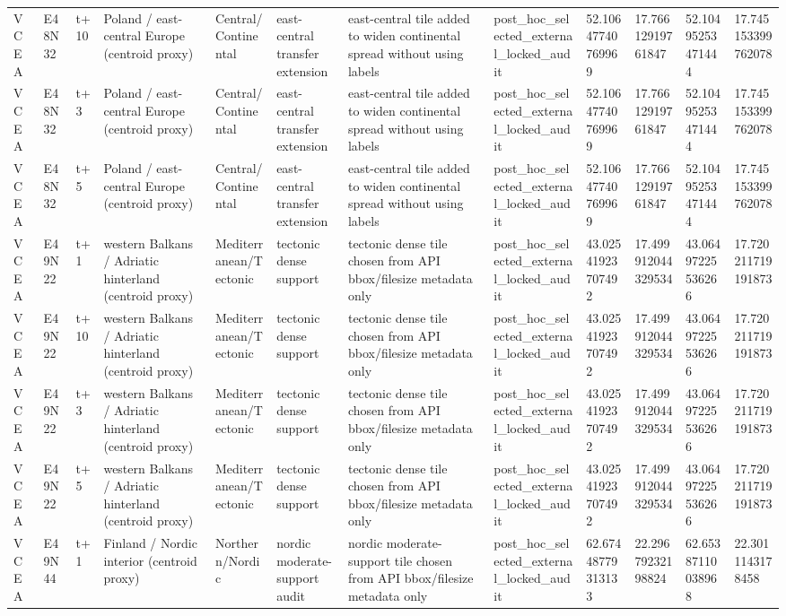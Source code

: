 \begin{landscape}
\begin{longtable}{llllllllllll}
VCEA & E48N32 & t+10 & Poland / east-central Europe (centroid proxy) & Central/Continental & east-central transfer extension & east-central tile added to widen continental spread without using labels & post\_hoc\_selected\_external\_locked\_audit & 52.10647740769969 & 17.76612919761847 & 52.10495253471444 & 17.745153399762078 \\
VCEA & E48N32 & t+3 & Poland / east-central Europe (centroid proxy) & Central/Continental & east-central transfer extension & east-central tile added to widen continental spread without using labels & post\_hoc\_selected\_external\_locked\_audit & 52.10647740769969 & 17.76612919761847 & 52.10495253471444 & 17.745153399762078 \\
VCEA & E48N32 & t+5 & Poland / east-central Europe (centroid proxy) & Central/Continental & east-central transfer extension & east-central tile added to widen continental spread without using labels & post\_hoc\_selected\_external\_locked\_audit & 52.10647740769969 & 17.76612919761847 & 52.10495253471444 & 17.745153399762078 \\
VCEA & E49N22 & t+1 & western Balkans / Adriatic hinterland (centroid proxy) & Mediterranean/Tectonic & tectonic dense support & tectonic dense tile chosen from API bbox/filesize metadata only & post\_hoc\_selected\_external\_locked\_audit & 43.02541923707492 & 17.499912044329534 & 43.06497225536266 & 17.720211719191873 \\
VCEA & E49N22 & t+10 & western Balkans / Adriatic hinterland (centroid proxy) & Mediterranean/Tectonic & tectonic dense support & tectonic dense tile chosen from API bbox/filesize metadata only & post\_hoc\_selected\_external\_locked\_audit & 43.02541923707492 & 17.499912044329534 & 43.06497225536266 & 17.720211719191873 \\
VCEA & E49N22 & t+3 & western Balkans / Adriatic hinterland (centroid proxy) & Mediterranean/Tectonic & tectonic dense support & tectonic dense tile chosen from API bbox/filesize metadata only & post\_hoc\_selected\_external\_locked\_audit & 43.02541923707492 & 17.499912044329534 & 43.06497225536266 & 17.720211719191873 \\
VCEA & E49N22 & t+5 & western Balkans / Adriatic hinterland (centroid proxy) & Mediterranean/Tectonic & tectonic dense support & tectonic dense tile chosen from API bbox/filesize metadata only & post\_hoc\_selected\_external\_locked\_audit & 43.02541923707492 & 17.499912044329534 & 43.06497225536266 & 17.720211719191873 \\
VCEA & E49N44 & t+1 & Finland / Nordic interior (centroid proxy) & Northern/Nordic & nordic moderate-support audit & nordic moderate-support tile chosen from API bbox/filesize metadata only & post\_hoc\_selected\_external\_locked\_audit & 62.67448779313133 & 22.29679232198824 & 62.65387110038968 & 22.3011143178458 \\

\end{longtable}
\end{landscape}
